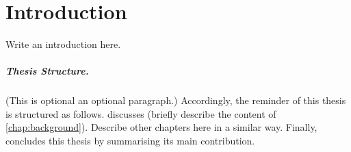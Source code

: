 \chapter{Introduction}
\label{chap:introduction}

Write an introduction here.

%
\paragraph{Thesis Structure.} %
%

(This is optional an optional paragraph.)
%
Accordingly, the reminder of this thesis is structured as follows.
%
 discusses (briefly describe the content of \cref{chap:background}).
%
Describe other chapters here in a similar way.
%
Finally,  concludes this thesis by summarising its main contribution.